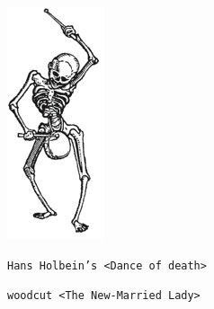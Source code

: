 \documentclass{book}
\begin{document}
\begin{titlepage} 
\clearpage
\ifodd\thepage\hbox{}\newpage\else\fi%
\thispagestyle{empty}

\pagecolor{aureolin!30}

\vspace*{\baselineskip} 	
	
	\vspace*{0.167\textheight} 
	
\centerline{\includegraphics[scale=0.8]{img/logo}}
\vspace{.5cm}
  
\centerline{  {\tiny  \texttt{Hans Holbein's <Dance of death>} }}
\vspace{-0.2cm} 
\centerline{  {\tiny  \texttt{woodcut <The New-Married Lady>} }}

\end{titlepage}
\end{document}
